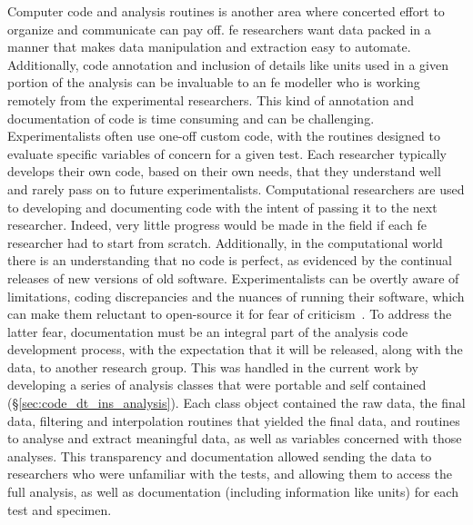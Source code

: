 Computer code and analysis routines is another area where concerted effort to organize and communicate can pay off.
\ac{fe} researchers want data packed in a manner that makes data manipulation and extraction easy to automate.
Additionally, code annotation and inclusion of details like units used in a given portion of the analysis can be invaluable to an \ac{fe} modeller who is working remotely from the experimental researchers.
This kind of annotation and documentation of code is time consuming and can be challenging.
Experimentalists often use one-off custom code, with the routines designed to evaluate specific variables of concern for a given test.
Each researcher typically develops their own code, based on their own needs, that they understand well and rarely pass on to future experimentalists.
Computational researchers are used to developing and documenting code with the intent of passing it to the next researcher.
Indeed, very little progress would be made in the field if each \ac{fe} researcher had to start from scratch.
Additionally, in the computational world there is an understanding that no code is perfect, as evidenced by the continual releases of new versions of old software.
Experimentalists can be overtly aware of limitations, coding discrepancies and the nuances of running their software, which can make them reluctant to open-source it for fear of criticism~\citep{barnes_publish_2010}.
To address the latter fear, documentation must be an integral part of the analysis code development process, with the expectation that it will be released, along with the data, to another research group.
This was handled in the current work by developing a series of analysis classes that were portable and self contained (\S\ref{sec:code_dt_ins_analysis}).
Each class object contained the raw data, the final data, filtering and interpolation routines that yielded the final data, and routines to analyse and extract meaningful data, as well as variables concerned with those analyses.
This transparency and documentation allowed sending the data to researchers who were unfamiliar with the tests, and allowing them to access the full analysis, as well as documentation (including information like units) for each test and specimen.

